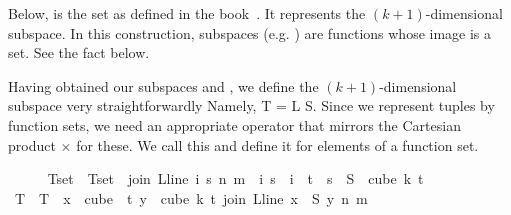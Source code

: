 \begin{isabellebody}
%
\endisatagproof
{\isafoldproof}%
%
\isadelimproof
%
\endisadelimproof
%
\isadelimdocument
%
\endisadelimdocument
%
\isatagdocument
%
\isamarkuptrue%
%
\begin{isamarkuptext}%
Below,  is the set as defined in the book~\cite{thebook}. It represents the $(k+1)$-dimensional subspace. In this construction, subspaces (e.g. ) are functions whose image is a set. See the fact  below.%
\end{isamarkuptext}\isamarkuptrue%
%
\begin{isamarkuptext}%
Having obtained our subspaces  and , we define the $(k+1)$-dimensional subspace very straightforwardly Namely, T = L \times S. Since we represent tuples by function sets, we need an appropriate operator that mirrors the Cartesian product $\times$ for these. We call this  and define it for elements of a function set.%
\end{isamarkuptext}\isamarkuptrue%
%
\endisatagdocument
{\isafolddocument}%
%
\isadelimdocument
%
\endisadelimdocument
%
\isadelimproof
\ \ \ \ %
\endisadelimproof
%
\isatagproof
{}\isamarkupfalse%
\ Tset\ \ {\isachardoublequoteopen}Tset\ {\isasymequiv}\ {\isacharbraceleft}{\kern0pt}join\ {\isacharparenleft}{\kern0pt}L{\isacharunderscore}{\kern0pt}line\ i{\isacharparenright}{\kern0pt}\ s\ n\ m\ {\isacharbar}{\kern0pt}\ i\ s\ {\isachardot}{\kern0pt}\ i\ {\isasymin}\ {\isacharbraceleft}{\kern0pt}{\isachardot}{\kern0pt}{\isachardot}{\kern0pt}{\isacharless}{\kern0pt}t{\isacharplus}{\kern0pt}{}{\isacharbraceright}{\kern0pt}\ {\isasymand}\ s\ {\isasymin}\ S\ {\isacharbackquote}{\kern0pt}\ {\isacharparenleft}{\kern0pt}cube\ k\ {\isacharparenleft}{\kern0pt}t{\isacharplus}{\kern0pt}{}{\isacharparenright}{\kern0pt}{\isacharparenright}{\kern0pt}{\isacharbraceright}{\kern0pt}{\isachardoublequoteclose}\isanewline
\ \ \ \ \isamarkupfalse%
\ T{\isacharprime}{\kern0pt}\ \ {\isachardoublequoteopen}T{\isacharprime}{\kern0pt}\ {\isasymequiv}\ {\isacharparenleft}{\kern0pt}{\isasymlambda}x\ {\isasymin}\ cube\ {}\ {\isacharparenleft}{\kern0pt}t{\isacharplus}{\kern0pt}{}{\isacharparenright}{\kern0pt}{\isachardot}{\kern0pt}\ {\isasymlambda}y\ {\isasymin}\ cube\ k\ {\isacharparenleft}{\kern0pt}t{\isacharplus}{\kern0pt}{}{\isacharparenright}{\kern0pt}{\isachardot}{\kern0pt}\ join\ {\isacharparenleft}{\kern0pt}L{\isacharunderscore}{\kern0pt}line\ {\isacharparenleft}{\kern0pt}x\ {}{\isacharparenright}{\kern0pt}{\isacharparenright}{\kern0pt}\ {\isacharparenleft}{\kern0pt}S\ y{\isacharparenright}{\kern0pt}\ n\ m{\isacharparenright}{\kern0pt}{\isachardoublequoteclose}\isanewline

\end{isabellebody}
